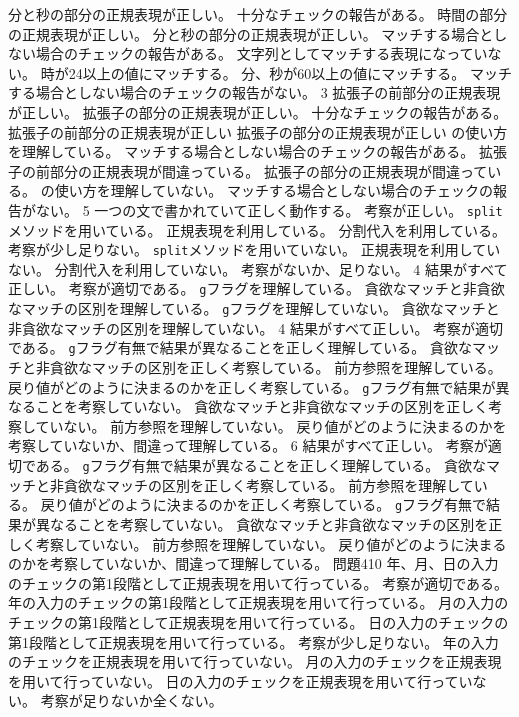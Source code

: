 {{	{分と秒の部分の正規表現が正しい。}
	{十分なチェックの報告がある。}
	}
	{
	{時間の部分の正規表現が正しい。}
	{分と秒の部分の正規表現が正しい。}
	{マッチする場合としない場合のチェックの報告がある。}
	}
	{
  {文字列としてマッチする表現になっていない。}
	{時が24以上の値にマッチする。}
	{分、秒が60以上の値にマッチする。}
	{マッチする場合としない場合のチェックの報告がない。}
	}
	{}{3}
	{
	{拡張子の前部分の正規表現が正しい。}
	{拡張子の部分の正規表現が正しい。}
	{十分なチェックの報告がある。}
	}
	{
	{拡張子の前部分の正規表現が正しい}
	{拡張子の部分の正規表現が正しい}
	{{\bfseries\textdollar}の使い方を理解している。}
	{マッチする場合としない場合のチェックの報告がある。}
	}
	{
	{拡張子の前部分の正規表現が間違っている。}
	{拡張子の部分の正規表現が間違っている。}
	{{\bfseries\textdollar}の使い方を理解していない。}
	{マッチする場合としない場合のチェックの報告がない。}
	}
	{}{5}
	{
	{一つの文で書かれていて正しく動作する。}
	{考察が正しい。}
	}
	{
	{\texttt{split}メソッドを用いている。}
	{正規表現を利用している。}
	{分割代入を利用している。}
	{考察が少し足りない。}
	}
	{
	{\texttt{split}メソッドを用いていない。}
	{正規表現を利用していない。}
	{分割代入を利用していない。}
	{考察がないか、足りない。}
	}
	{}{4}
	{
	{結果がすべて正しい。}
  {考察が適切である。}
	}
	{
	{\texttt{g}フラグを理解している。}
  {貪欲なマッチと非貪欲なマッチの区別を理解している。}
	}
	{
	{\texttt{g}フラグを理解していない。}
  {貪欲なマッチと非貪欲なマッチの区別を理解していない。}
	}
	{}{4}
	{
	{結果がすべて正しい。}
  {考察が適切である。}
	}
	{
	{\texttt{g}フラグ有無で結果が異なることを正しく理解している。}
  {貪欲なマッチと非貪欲なマッチの区別を正しく考察している。}
  {前方参照を理解している。}
  {戻り値がどのように決まるのかを正しく考察している。}
	}
	{
	{\texttt{g}フラグ有無で結果が異なることを考察していない。}
  {貪欲なマッチと非貪欲なマッチの区別を正しく考察していない。}
  {前方参照を理解していない。}
  {戻り値がどのように決まるのかを考察していないか、間違って理解している。}
	}
	{}{6}
	{
	{結果がすべて正しい。}
  {考察が適切である。}
	}
	{
	{\texttt{g}フラグ有無で結果が異なることを正しく理解している。}
  {貪欲なマッチと非貪欲なマッチの区別を正しく考察している。}
  {前方参照を理解している。}
  {戻り値がどのように決まるのかを正しく考察している。}
	}
	{
	{\texttt{g}フラグ有無で結果が異なることを考察していない。}
  {貪欲なマッチと非貪欲なマッチの区別を正しく考察していない。}
  {前方参照を理解していない。}
  {戻り値がどのように決まるのかを考察していないか、間違って理解している。}
	}
	{問題4}{10}
	{
	{年、月、日の入力のチェックの第1段階として正規表現を用いて行っている。}
  {考察が適切である。}
	}
	{
	{年の入力のチェックの第1段階として正規表現を用いて行っている。}
	{月の入力のチェックの第1段階として正規表現を用いて行っている。}
	{日の入力のチェックの第1段階として正規表現を用いて行っている。}
  {考察が少し足りない。}
	}
	{
	{年の入力のチェックを正規表現を用いて行っていない。}
	{月の入力のチェックを正規表現を用いて行っていない。}
	{日の入力のチェックを正規表現を用いて行っていない。}
  {考察が足りないか全くない。}
	}
}